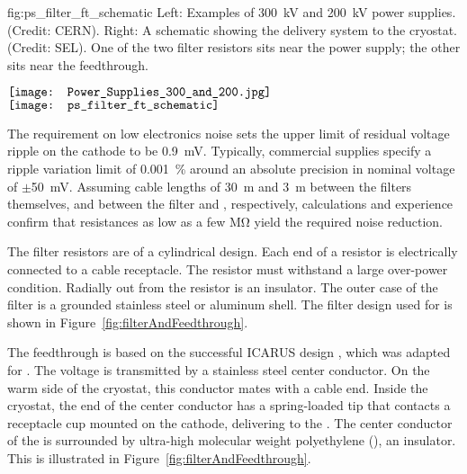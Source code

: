 \begin{dunefigure}  
{fig:ps_filter_ft_schematic}
{Left: Examples of \SI{300}{kV} and \SI{200}{kV} power supplies. %
 (Credit: CERN). Right:  A schematic showing the  delivery system to the cryostat. (Credit:  SEL).  
One of the two filter resistors sits near the power supply; the other sits near the feedthrough.}
\begin{minipage}{\textwidth}%
  \centering
 $\vcenter{\hbox{\texttt{[image: Power\_Supplies\_300\_and\_200.jpg]}}}$
 \hspace*{0.001\textwidth}  $\vcenter{\hbox{\texttt{[image: ps\_filter\_ft\_schematic]}}}$
\end{minipage}
\end{dunefigure}
The requirement  
on low electronics noise sets the upper limit of residual voltage ripple on the cathode to be \SI{0.9}{mV}. 
Typically, commercial supplies specify a ripple variation limit of 
\SI{.001}{\%} around an absolute precision in nominal voltage of $\pm$\SI{50}{mV}.
%
Assuming cable lengths of \SI{30}{m} and \SI{3}{m} between the filters themselves, and between the filter and \fdth, respectively, calculations and experience confirm that resistances as low as a few \si{\mega\ohm} yield the required noise reduction. 

The %
filter resistors are of a cylindrical design. 
Each end of a  resistor is electrically connected to a cable receptacle. 
The resistor %
must withstand a large over-power condition.  Radially out from the resistor is an insulator. %
The outer case of the filter is a grounded stainless steel or aluminum shell. The filter design used for  is shown in Figure~\ref{fig:filterAndFeedthrough}.

The  feedthrough %
is based on the successful ICARUS design \cite{ICARUS-t600}, %
which was adapted for .  The voltage is transmitted by a stainless steel center conductor.  On the warm side of the cryostat, this conductor mates with a cable end.  Inside the cryostat, the end of the center conductor has a spring-loaded tip that %
contacts a receptacle cup mounted on the cathode, delivering  to the .  The center conductor of the \fdth is surrounded by ultra-high molecular weight polyethylene (), an insulator. This is illustrated in Figure~\ref{fig:filterAndFeedthrough}.

